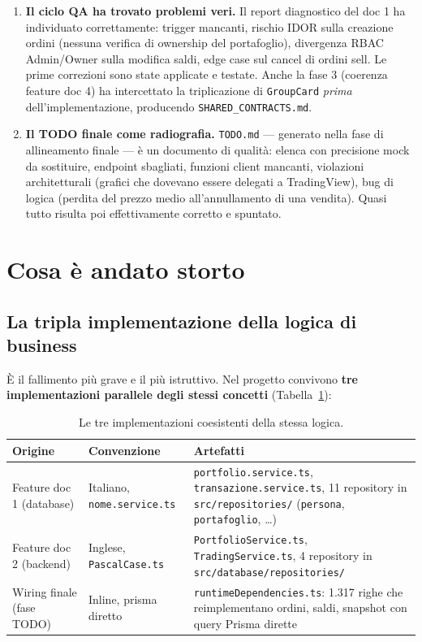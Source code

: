 \documentclass[11pt,a4paper]{article}
\newcommand{\file}[1]{\texttt{\small #1}}
\begin{document}
\begin{enumerate}[leftmargin=1.8em]
  \item \textbf{Il ciclo QA ha trovato problemi veri.} Il report diagnostico del doc 1 ha individuato correttamente: trigger mancanti, rischio IDOR sulla creazione ordini (nessuna verifica di ownership del portafoglio), divergenza RBAC Admin/Owner sulla modifica saldi, edge case sul cancel di ordini sell. Le prime correzioni sono state applicate e testate. Anche la fase 3 (coerenza feature doc 4) ha intercettato la triplicazione di \file{GroupCard} \emph{prima} dell'implementazione, producendo \file{SHARED\_CONTRACTS.md}.

  \item \textbf{Il TODO finale come radiografia.} \file{TODO.md} --- generato nella fase di allineamento finale --- \`e un documento di qualit\`a: elenca con precisione mock da sostituire, endpoint sbagliati, funzioni client mancanti, violazioni architetturali (grafici che dovevano essere delegati a TradingView), bug di logica (perdita del prezzo medio all'annullamento di una vendita). Quasi tutto risulta poi effettivamente corretto e spuntato.
\end{enumerate}

\section{Cosa \`e andato storto}

\subsection{La tripla implementazione della logica di business}
\label{sec:tripla}

\`E il fallimento pi\`u grave e il pi\`u istruttivo. Nel progetto convivono \textbf{tre implementazioni parallele degli stessi concetti} (Tabella~\ref{tab:tripla}):

\begin{table}[h!]
\centering
\small
\begin{tabular}{p{4.1cm}p{4.6cm}p{5.2cm}}
\toprule
\textbf{Origine} & \textbf{Convenzione} & \textbf{Artefatti} \\
\midrule
Feature doc 1 (database) & Italiano, \file{nome.service.ts} & \file{portfolio.service.ts}, \file{transazione.service.ts}, 11 repository in \file{src/repositories/} (\file{persona}, \file{portafoglio}, \dots) \\
\addlinespace
Feature doc 2 (backend) & Inglese, \file{PascalCase.ts} & \file{PortfolioService.ts}, \file{TradingService.ts}, 4 repository in \file{src/database/repositories/} \\
\addlinespace
Wiring finale (fase TODO) & Inline, prisma diretto & \file{runtimeDependencies.ts}: 1.317 righe che reimplementano ordini, saldi, snapshot con query Prisma dirette \\
\bottomrule
\end{tabular}
\caption{Le tre implementazioni coesistenti della stessa logica.}
\label{tab:tripla}
\end{table}
\end{document}
